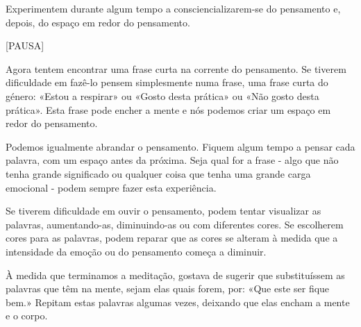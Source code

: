 Experimentem durante algum tempo a consciencializarem-se do pensamento
e, depois, do espaço em redor do pensamento.

{[}PAUSA{]}

Agora tentem encontrar uma frase curta na corrente do pensamento. Se
tiverem dificuldade em fazê-lo pensem simplesmente numa frase, uma frase
curta do género: «Estou a respirar» ou «Gosto desta prática» ou «Não
gosto desta prática». Esta frase pode encher a mente e nós podemos criar
um espaço em redor do pensamento.

Podemos igualmente abrandar o pensamento. Fiquem algum tempo a pensar
cada palavra, com um espaço antes da próxima. Seja qual for a frase -
algo que não tenha grande significado ou qualquer coisa que tenha uma
grande carga emocional - podem sempre fazer esta experiência.

Se tiverem dificuldade em ouvir o pensamento, podem tentar visualizar as
palavras, aumentando-as, diminuindo-as ou com diferentes cores. Se
escolherem cores para as palavras, podem reparar que as cores se alteram
à medida que a intensidade da emoção ou do pensamento começa a diminuir.

À medida que terminamos a meditação, gostava de sugerir que
substituíssem as palavras que têm na mente, sejam elas quais forem, por:
«Que este ser fique bem.» Repitam estas palavras algumas vezes, deixando
que elas encham a mente e o corpo.
